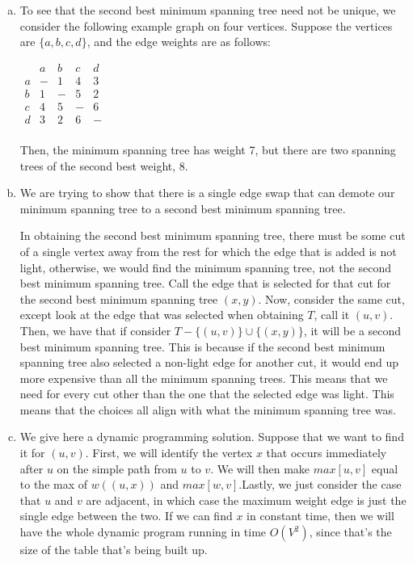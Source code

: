 \documentclass{article}
\begin{document}
\begin{enumerate}[a.]
\item
To see that the second best minimum spanning tree need not be unique, we consider the following example graph on four vertices. Suppose the vertices are $\{a,b,c,d\}$, and the edge weights are as follows:

$
\begin{array}{c|c|c|c|c|}
&a&b&c&d\\
\hline
a&-&1&4&3\\
\hline
b&1&-&5&2\\
\hline
c&4&5&-&6\\
\hline
d&3&2&6&-\\
\end{array}
$

Then, the minimum spanning tree has weight 7, but there are two spanning trees of the second best weight, 8.
\item
We are trying to show that there is a single edge swap that can demote our minimum spanning tree to a second best minimum spanning tree. 

In obtaining the second best minimum spanning tree, there must be some cut of a single vertex away from the rest for which the edge that is added is not light, otherwise, we would find the minimum spanning tree, not the second best minimum spanning tree. Call the edge that is selected for that cut for the second best minimum spanning tree $(x,y)$. Now, consider the same cut, except look at the edge that was selected when obtaining $T$, call it $(u,v)$. Then, we have that if consider $T - \{(u,v)\} \cup \{(x,y)\}$, it will be a second best minimum spanning tree. This is because if the second best minimum spanning tree also selected a non-light edge for another cut, it would end up more expensive than all the minimum spanning trees. This means that we need for every cut other than the one that the selected edge was light. This means that the choices all align with what the minimum spanning tree was.
\item
We give here a dynamic programming solution. Suppose that we want to find it for $(u,v)$. First, we will identify the vertex $x$ that occurs immediately after $u$ on the simple path from $u$ to $v$. We will then make $max[u,v]$ equal to the max of $w((u,x))$ and $max[w,v]$.Lastly, we just consider the case that $u$ and $v$ are adjacent, in which case the maximum weight edge is just the single edge between the two. If we can find $x$ in constant time, then we will have the whole dynamic program running in time $O(V^2)$, since that's the size of the table that's being built up. 


\end{enumerate}
\end{document}
